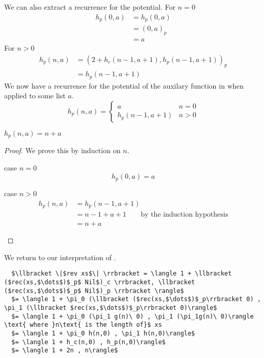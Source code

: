 We can also extract a recurrence for the potential.
For $n=0$
%
\begin{align*}
h_p(0,a) &= h_p(0,a) \\
         &= (0, a)_p \\
         &= a
\end{align*}
%
For $n>0$
%
\begin{align*}
  h_p(n,a) &= (2 + h_c(n-1,a+1), h_p(n-1,a+1))_p \\
           &= h_p(n-1,a+1)
\end{align*}
%
We now have a recurrence for the potential of the auxilary function in
 when applied to some list $a$.
%
\begin{equation}
  h_p(n,a) = \begin{cases}
    a & n = 0 \\
    h_p(n-1,a+1) & n > 0
  \end{cases}
\end{equation}
%
\begin{theorem}
  \label{lem:fr_interp_h_potential}
  $h_p(n,a) = n + a$
\end{theorem}
%
\begin{proof}
  We prove this by induction on $n$.
  \begin{description}
    \item{case $n=0$}\hfill \\
      \[ h_p(0,a) = a \]
    \item{case $n>0$}\hfill \\
      \begin{align*}
      h_p(n,a) &= h_p(n-1,a+1) \\
               &= n - 1 + a + 1  \qquad \text{by the induction hypothesis} \\
               &= n + a
      \end{align*}
  \end{description}
\end{proof}  
%


We return to our interpretation of .
\begin{lstlisting}
  $\llbracket \|$rev xs$\| \rrbracket = \langle 1 + \llbracket ($rec(xs,$\dots$)$_p$ Nil$)_c \rrbracket, \llbracket ($rec(xs,$\dots$)$_p$ Nil$)_p \rrbracket \rangle$
  $= \langle 1 + \pi_0 (\llbracket ($rec(xs,$\dots$)$_p\rrbracket 0) , \pi_1 (\llbracket $rec(xs,$\dots$)$_p\rrbracket 0)\rangle$
  $= \langle 1 + \pi_0 (\pi_1 g(n)\ 0) , \pi_1 (\pi_1g(n)\ 0)\rangle \text{ where }n\text{ is the length of}$ xs
  $= \langle 1 + \pi_0 h(n,0) , \pi_1 h(n,0)\rangle$
  $= \langle 1 + h_c(n,0) , h_p(n,0)\rangle$
  $= \langle 1 + 2n , n\rangle$
\end{lstlisting}

